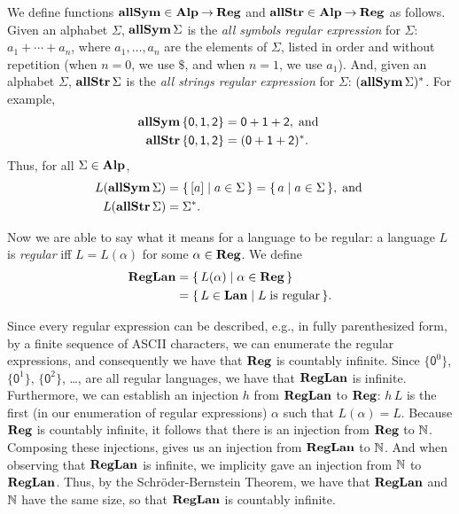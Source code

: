 We define functions $\mathbf{allSym}\in\mathbf{Alp}\mathbin{\to}\mathbf{Reg}$ and $\mathbf{allStr}\in
\mathbf{Alp}\mathbin{\to}\mathbf{Reg}$ as follows.  Given an alphabet $\Sigma$, $\mathbf{allSym}\,\Sigma$
is the \emph{all symbols regular expression} for $\Sigma$:
$a_1+\cdots+a_n$, where $a_1,\ldots,a_n$
  are the elements of $\Sigma$, listed in order and without repetition
  (when $n=0$, we use $\$$, and when $n=1$, we use $a_1$).
And, given an alphabet $\Sigma$, $\mathbf{allStr}\,\Sigma$ is
the \emph{all strings regular expression} for $\Sigma$:
$(\mathbf{allSym}\,\Sigma)^*$.
For example, 
\begin{align*}
\mathbf{allSym}\,\{\mathsf{0,1,2}\} &= \mathsf{0 + 1 + 2} , \;\allowbreak\mbox{and}\allowbreak\; \\
\mathbf{allStr}\,\{\mathsf{0,1,2}\} &= (\mathsf{0 + 1 + 2})^* .
\end{align*}
Thus, for all $\Sigma\in\mathbf{Alp}$,
\begin{align*}
L(\mathbf{allSym}\,\Sigma) &= \{ \, [a] \mid a\in\Sigma \, \} = \{ \, a \mid a\in\Sigma \, \},
\;\allowbreak\mbox{and}\allowbreak\; \\
L(\mathbf{allStr}\,\Sigma) &= \Sigma^* .
\end{align*}

%
%
Now we are able to say what it means for a language to be regular:
a language $L$ is \emph{regular} iff $L=L(\alpha)$ for some
$\alpha\in\mathbf{Reg}$.  We define
%
\begin{align*}
\mathbf{RegLan} &= \{ \, L(\alpha) \mid \alpha\in\mathbf{Reg} \, \} \\
&= \{ \, L\in\mathbf{Lan} \mid L\;\allowbreak\mbox{is regular}\allowbreak \, \} .
\end{align*}

Since every regular expression can be described, e.g., in fully
parenthesized form, by a finite sequence of ASCII characters, we can
enumerate the regular expressions, and consequently we have that
$\mathbf{Reg}$ is countably infinite.  Since $\{\mathsf{0}^0\}$,
$\{\mathsf{0}^1\}$, $\{\mathsf{0}^2\}$, \ldots, are all regular
languages, we have that $\mathbf{RegLan}$ is infinite.  Furthermore, we can
establish an injection $h$ from $\mathbf{RegLan}$ to $\mathbf{Reg}$: $h\,L$ is the
first (in our enumeration of regular expressions) $\alpha$ such that
$L(\alpha)=L$.  Because $\mathbf{Reg}$ is countably infinite, it follows that
there is an injection from $\mathbf{Reg}$ to $\mathbb{N}$.  Composing these
injections, gives us an injection from $\mathbf{RegLan}$ to $\mathbb{N}$.  And when
observing that $\mathbf{RegLan}$ is infinite, we implicity gave an injection
from $\mathbb{N}$ to $\mathbf{RegLan}$. Thus, by the Schr\"oder-Bernstein Theorem,
we have that $\mathbf{RegLan}$ and $\mathbb{N}$ have the same size, so that
$\mathbf{RegLan}$ is countably infinite.

